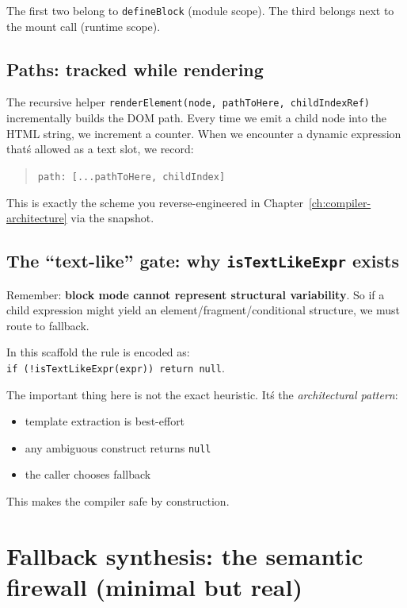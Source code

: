 The first two belong to \texttt{defineBlock} (module scope).
The third belongs next to the mount call (runtime scope).

\subsection{Paths: tracked while rendering}

The recursive helper \texttt{renderElement(node, pathToHere, childIndexRef)} incrementally builds the DOM path.
Every time we emit a child node into the HTML string, we increment a counter.
When we encounter a dynamic expression that\'s allowed as a text slot, we record:

\begin{quote}
  	\texttt{path: [...pathToHere, childIndex]}
\end{quote}

This is exactly the scheme you reverse-engineered in Chapter~\ref{ch:compiler-architecture} via the snapshot.

\subsection{The ``text-like'' gate: why \texttt{isTextLikeExpr} exists}

Remember: \textbf{block mode cannot represent structural variability}.
So if a child expression might yield an element/fragment/conditional structure, we must route to fallback.

In this scaffold the rule is encoded as:\\
  	\texttt{if (!isTextLikeExpr(expr)) return null}.

The important thing here is not the exact heuristic.
It\'s the \emph{architectural pattern}:

\begin{itemize}
\item template extraction is best-effort
\item any ambiguous construct returns \texttt{null}
\item the caller chooses fallback
\end{itemize}

This makes the compiler safe by construction.

\section{Fallback synthesis: the semantic firewall (minimal but real)}


